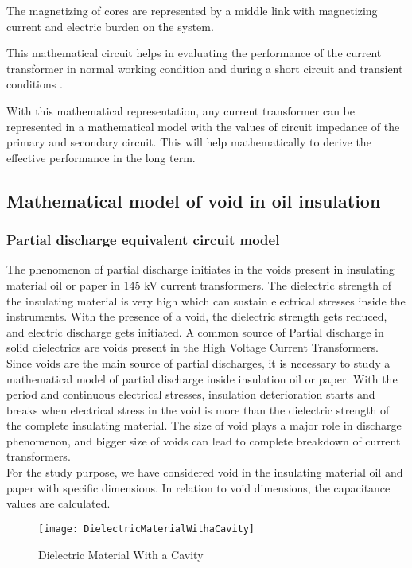 The magnetizing of cores are represented by a middle link with magnetizing current and electric burden on the system.

This mathematical circuit helps in evaluating the performance of the current transformer in normal working condition and during a short circuit and transient conditions \cite{harrold1985influence}.

With this mathematical representation, any current transformer can be represented in a mathematical model with the values of circuit impedance of the primary and secondary circuit. This will help mathematically to derive the effective performance in the long term\setlength{\parskip}{0em}.  

\subsection{Mathematical model of void in oil insulation}
\subsubsection{Partial discharge equivalent circuit model}
The phenomenon of partial discharge initiates in the voids present in insulating material oil or paper in 145 kV current transformers. The dielectric strength of the insulating material is very high which can sustain electrical stresses inside the instruments. With the presence of a void, the dielectric strength gets reduced, and electric discharge gets initiated. A common source of Partial discharge in solid dielectrics are voids present in the High Voltage Current Transformers. Since voids are the main source of partial discharges, it is necessary to study a mathematical model of partial discharge inside insulation oil or paper. With the period and continuous electrical stresses, insulation deterioration starts and breaks when electrical stress in the void is more than the dielectric strength of the complete insulating material. The size of void plays a major role in discharge phenomenon, and bigger size of voids can lead to complete breakdown of current transformers.\\

For the study purpose, we have considered void in the insulating material oil and paper with specific dimensions. In relation to void dimensions, the capacitance values are calculated. 

\begin{figure}[h!]
\centering
\texttt{[image: DielectricMaterialWithaCavity]}
\caption{Dielectric Material With a Cavity}
\label{fig:Dielectric Material With a Cavity}
\end{figure}

